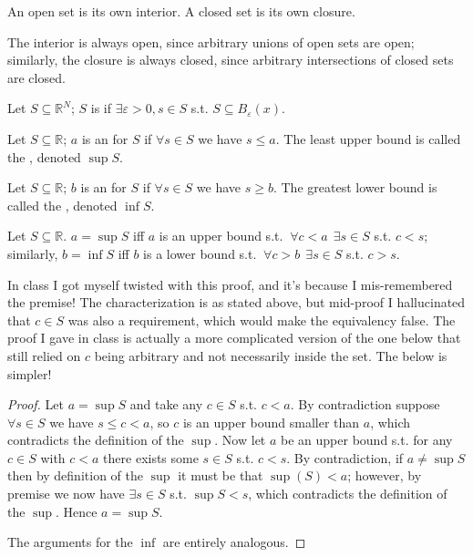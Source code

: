 \documentclass{article}
\begin{document}
\begin{claim}
  An open set is its own interior. A closed set is its own closure.
\end{claim}

The interior is always open, since arbitrary unions of open sets are open; similarly, the closure is always closed, since arbitrary intersections of closed sets are closed.
\begin{definition}
  Let $S \subseteq \mathbb{R}^N$; $S$ is  if $\exists \varepsilon > 0, s \in S$ s.t. $S \subseteq B_{\varepsilon}(x)$.
\end{definition}

\begin{definition}
  Let $S \subseteq \mathbb{R}$; $a$ is an  for $S$ if $\forall s \in S$ we have $s \le a$. The least upper bound is called the , denoted $\sup S$.
\end{definition}

\begin{definition}
  Let $S \subseteq \mathbb{R}$; $b$ is an  for $S$ if $\forall s \in S$ we have $s \ge b$. The greatest lower bound is called the , denoted $\inf S$.
\end{definition}

\begin{claim}
  Let $S \subseteq \mathbb{R}$. $a = \sup S$ iff $a$ is an upper bound s.t. $~ \forall c < a ~~ \exists s \in S$ s.t. $c < s$; similarly, $b = \inf S$ iff $b$ is a lower bound s.t. $~ \forall c > b ~~ \exists s \in S$ s.t. $c > s$.
\end{claim}

\begin{remark}
  In class I got myself twisted with this proof, and it's because I mis-remembered the premise! The characterization is as stated above, but mid-proof I hallucinated that $c \in S$ was also a requirement, which would make the equivalency false. The proof I gave in class is actually a more complicated version of the one below that still relied on $c$ being arbitrary and not necessarily inside the set. The below is simpler!
\end{remark}

\begin{proof}
  Let $a = \sup S$ and take any $c \in S$ s.t. $c < a$. By contradiction suppose $\forall s \in S$ we have $s \le c < a$, so $c$ is an upper bound smaller than $a$, which contradicts the definition of the $\sup$. Now let $a$ be an upper bound s.t. for any $c \in S$ with $c < a$ there exists some $s \in S$ s.t. $c < s$. By contradiction, if $a \ne \sup S$ then by definition of the $\sup$ it must be that $\sup(S) < a$; however, by premise we now have $\exists s \in S$ s.t. $\sup S < s$, which contradicts the definition of the $\sup$. Hence $a = \sup S$.

  The arguments for the $\inf$ are entirely analogous.
\end{proof}
\end{document}
